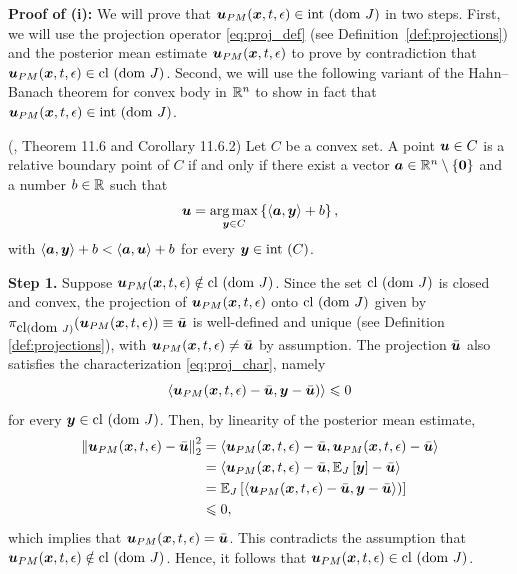 \textbf{Proof of (i):} We will prove that $\boldsymbol{u}_{PM}(\boldsymbol{x},t,\epsilon)\in\mathrm{int~}(\mathrm{dom~} J)$ in two steps. First, we will use the projection operator \eqref{eq:proj_def} (see Definition~\ref{def:projections}) and the posterior mean estimate $\boldsymbol{u}_{PM}(\boldsymbol{x},t,\epsilon)$ to prove by contradiction that $\boldsymbol{u}_{PM}(\boldsymbol{x},t,\epsilon)\in\mathrm{cl~}(\mathrm{dom~} J)$. Second, we will use the following variant of the Hahn--Banach theorem for convex body in $\mathbb{R}^n$ to show in fact that $\boldsymbol{u}_{PM}(\boldsymbol{x},t,\epsilon)\in\mathrm{int~}(\mathrm{dom~} J)$.
\begin{thm} \label{thm:tech_res_2} (\citep{rockafellar1970convex}, Theorem 11.6 and Corollary 11.6.2)
Let $C$ be a convex set. A point $\boldsymbol{u}\in C$ is a relative boundary point of $C$ if and only if there exist a vector $\boldsymbol{a}\in\mathbb{R}^n\setminus\{\boldsymbol{0}\}$ and a number $b\in\mathbb{R}$ such that 
\[
\boldsymbol{u}=\operatorname*{arg\,max}_{\boldsymbol{y}\in C}\left\{\left\langle \boldsymbol{a},\boldsymbol{y}\right\rangle +b\right\},
\]
with $\left\langle \boldsymbol{a},\boldsymbol{y}\right\rangle +b < \left\langle \boldsymbol{a},\boldsymbol{u}\right\rangle +b$ for every $\boldsymbol{y} \in \mathrm{int~}(C)$.
\end{thm}

\textbf{Step 1.} Suppose $\boldsymbol{u}_{PM}(\boldsymbol{x},t,\epsilon)\notin\mathrm{cl~}(\mathrm{dom~} J)$. Since the set $\mathrm{cl~}(\mathrm{dom~} J)$ is closed and convex, the projection of $\boldsymbol{u}_{PM}(\boldsymbol{x},t,\epsilon)$ onto $\mathrm{cl~}(\mathrm{dom~} J)$ given by $\pi_{\mbox{cl}(\mbox{dom }J)}(\boldsymbol{u}_{PM}(\boldsymbol{x},t,\epsilon)) \equiv \bar{\boldsymbol{u}}$ is well-defined and unique (see Definition \ref{def:projections}), with $\boldsymbol{u}_{PM}(\boldsymbol{x},t,\epsilon)\neq\bar{\boldsymbol{u}}$ by assumption. The projection $\bar{\boldsymbol{u}}$ also satisfies the characterization \eqref{eq:proj_char}, namely
\[
\left\langle \boldsymbol{u}_{PM}(\boldsymbol{x},t,\epsilon)-\bar{\boldsymbol{u}},\boldsymbol{y}-\bar{\boldsymbol{u}})\right\rangle \leqslant0
\]
for every $\boldsymbol{y}\in\mathrm{cl~}(\mathrm{dom~} J)$. Then, by linearity of the posterior mean estimate,
\begin{equation*}
\begin{alignedat}{1}
\left\Vert \boldsymbol{u}_{PM}(\boldsymbol{x},t,\epsilon)-\bar{\boldsymbol{u}}\right\Vert_2 ^{2} &= \left\langle\boldsymbol{u}_{PM}(\boldsymbol{x},t,\epsilon)-\bar{\boldsymbol{u}}, \boldsymbol{u}_{PM}(\boldsymbol{x},t,\epsilon)-\bar{\boldsymbol{u}}\right\rangle\\
&= \left\langle\boldsymbol{u}_{PM}(\boldsymbol{x},t,\epsilon)-\bar{\boldsymbol{u}}, \mathbb{E}_{J}\left [{\boldsymbol{y}}\right]-\bar{\boldsymbol{u}}\right\rangle\\
&= \mathbb{E}_{J}\left [{\left\langle \boldsymbol{u}_{PM}(\boldsymbol{x},t,\epsilon)-\bar{\boldsymbol{u}},\boldsymbol{y}-\bar{\boldsymbol{u}}\right\rangle)}\right] \\
&\leqslant 0,
\end{alignedat}
\end{equation*}
which implies that $\boldsymbol{u}_{PM}(\boldsymbol{x},t,\epsilon) = \bar{\boldsymbol{u}}$. This contradicts the assumption that $\boldsymbol{u}_{PM}(\boldsymbol{x},t,\epsilon)\notin\mathrm{cl~}(\mathrm{dom~} J)$. Hence, it follows that $\boldsymbol{u}_{PM}(\boldsymbol{x},t,\epsilon)\in\mathrm{cl~}(\mathrm{dom~} J)$.

